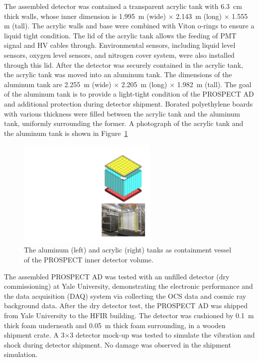 The assembled detector was contained a transparent acrylic tank with 6.3~cm thick walls, whose inner dimension is  1.995~m (wide) $\times$ 2.143~m (long) $\times$ 1.555 m (tall).
The acrylic walls and base were combined with Viton o-rings to ensure a liquid tight condition.
The lid of the acrylic tank allows the feeding of PMT signal and HV cables through. 
Environmental sensors, including liquid level sensors, oxygen level sensors, and nitrogen cover system, were also installed through this lid.
After the detector was securely contained in the acrylic tank, the acrylic tank was moved into an aluminum tank.
The dimensions of the aluminum tank are 2.255~m (wide) $\times$ 2.205~m (long) $\times$ 1.982~m (tall).
The goal of the aluminum tank is to provide a light-tight condition of the PROSPECT AD and additional protection during detector shipment. 
Borated polyethylene boards with various thickness were filled between the acrylic tank and the aluminum tank, uniformly surrounding the former.
A photograph of the acrylic tank and the aluminum tank is shown in Figure~\ref{fig:tanks}

\begin{figure}[h!]
\centering
\includegraphics[width=0.6\textwidth]{Figures/Tank.pdf}\quad
\caption[The acrylic and aluminum tanks as containment vessel of the detector]{
The aluminum (left) and acrylic (right) tanks as containment vessel of the PROSPECT inner detector volume.}
\label{fig:tanks}
\end{figure}

The assembled PROSPECT AD was tested with an unfilled detector (dry commissioning) at Yale University, demonstrating the electronic performance and the data acquisition (DAQ) system via collecting the OCS data and cosmic ray background data.
After the dry detector test, the PROSPECT AD was shipped from Yale University to the HFIR building. 
The detector was cushioned by 0.1~m thick foam underneath and 0.05~m thick foam surrounding, in a wooden shipment crate.
A 3$\times$3 detector mock-up was tested to simulate the vibration and shock during detector shipment.
No damage was observed in the shipment simulation.
 
